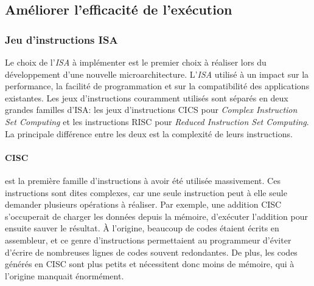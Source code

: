\subsection{Améliorer l'efficacité de l'exécution} \label{sec:efficacite}




\subsubsection{Jeu d'instructions ISA } \label{sec:isa}

Le choix de l'\textit{ISA} à implémenter est le premier choix à réaliser lors du développement d'une nouvelle microarchitecture. L'\textit{ISA} utilisé à un impact sur la performance, la facilité de programmation et sur la compatibilité des applications existantes. Les jeux d'instructions couramment utilisés sont séparés en deux grandes familles d'ISA: les jeux d'instructions CICS pour \textit{Complex Instruction Set Computing} et les instructions RISC pour \textit{Reduced Instruction Set Computing}. La principale différence entre les deux est la complexité de leurs instructions. 

    \paragraph{CISC} est la première famille d'instructions à avoir été utilisée massivement. Ces instructions sont dites complexes, car une seule instruction peut à elle seule demander plusieurs opérations à réaliser. Par exemple, une addition CISC s'occuperait de charger les données depuis la mémoire, d'exécuter l'addition pour ensuite sauver le résultat. À l'origine, beaucoup de codes étaient écrits en assembleur, et ce genre d'instructions permettaient au programmeur d'éviter d'écrire de nombreuses lignes de codes souvent redondantes. De plus, les codes générés en CISC sont plus petits et nécessitent donc moins de mémoire, qui à l'origine manquait énormément.

